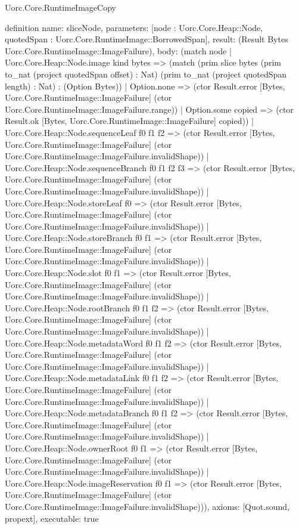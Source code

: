\begin{lexlean}{Uorc.Core.RuntimeImageCopy}
\begin{semanticmodule}
definition{
  name: sliceNode,
  parameters: [node : Uorc.Core.Heap::Node, quotedSpan : Uorc.Core.RuntimeImage::BorrowedSpan],
  result: (Result Bytes Uorc.Core.RuntimeImage::ImageFailure),
  body: (match node
    | Uorc.Core.Heap::Node.image kind bytes => (match (prim slice bytes (prim to_nat (project quotedSpan offset) : Nat) (prim to_nat (project quotedSpan length) : Nat) : (Option Bytes))
      | Option.none => (ctor Result.error [Bytes, Uorc.Core.RuntimeImage::ImageFailure] (ctor Uorc.Core.RuntimeImage::ImageFailure.range))
      | Option.some copied => (ctor Result.ok [Bytes, Uorc.Core.RuntimeImage::ImageFailure] copied))
    | Uorc.Core.Heap::Node.sequenceLeaf f0 f1 f2 => (ctor Result.error [Bytes, Uorc.Core.RuntimeImage::ImageFailure] (ctor Uorc.Core.RuntimeImage::ImageFailure.invalidShape))
    | Uorc.Core.Heap::Node.sequenceBranch f0 f1 f2 f3 => (ctor Result.error [Bytes, Uorc.Core.RuntimeImage::ImageFailure] (ctor Uorc.Core.RuntimeImage::ImageFailure.invalidShape))
    | Uorc.Core.Heap::Node.storeLeaf f0 => (ctor Result.error [Bytes, Uorc.Core.RuntimeImage::ImageFailure] (ctor Uorc.Core.RuntimeImage::ImageFailure.invalidShape))
    | Uorc.Core.Heap::Node.storeBranch f0 f1 => (ctor Result.error [Bytes, Uorc.Core.RuntimeImage::ImageFailure] (ctor Uorc.Core.RuntimeImage::ImageFailure.invalidShape))
    | Uorc.Core.Heap::Node.slot f0 f1 => (ctor Result.error [Bytes, Uorc.Core.RuntimeImage::ImageFailure] (ctor Uorc.Core.RuntimeImage::ImageFailure.invalidShape))
    | Uorc.Core.Heap::Node.rootBranch f0 f1 f2 => (ctor Result.error [Bytes, Uorc.Core.RuntimeImage::ImageFailure] (ctor Uorc.Core.RuntimeImage::ImageFailure.invalidShape))
    | Uorc.Core.Heap::Node.metadataWord f0 f1 f2 => (ctor Result.error [Bytes, Uorc.Core.RuntimeImage::ImageFailure] (ctor Uorc.Core.RuntimeImage::ImageFailure.invalidShape))
    | Uorc.Core.Heap::Node.metadataLink f0 f1 f2 => (ctor Result.error [Bytes, Uorc.Core.RuntimeImage::ImageFailure] (ctor Uorc.Core.RuntimeImage::ImageFailure.invalidShape))
    | Uorc.Core.Heap::Node.metadataBranch f0 f1 f2 => (ctor Result.error [Bytes, Uorc.Core.RuntimeImage::ImageFailure] (ctor Uorc.Core.RuntimeImage::ImageFailure.invalidShape))
    | Uorc.Core.Heap::Node.ownerRoot f0 f1 => (ctor Result.error [Bytes, Uorc.Core.RuntimeImage::ImageFailure] (ctor Uorc.Core.RuntimeImage::ImageFailure.invalidShape))
    | Uorc.Core.Heap::Node.imageReservation f0 f1 => (ctor Result.error [Bytes, Uorc.Core.RuntimeImage::ImageFailure] (ctor Uorc.Core.RuntimeImage::ImageFailure.invalidShape))),
  axioms: [Quot.sound, propext],
  executable: true
}


\end{semanticmodule}
\end{lexlean}
